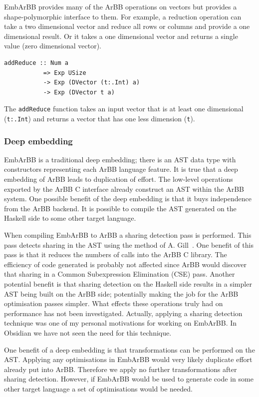 \documentclass[a4paper]{book}
\begin{document}
EmbArBB provides many of the ArBB operations on vectors but provides a 
shape-polymorphic interface to them. For example, a reduction operation can take a two  
dimensional vector and reduce all rows or columns and provide a one dimensional result. Or 
it takes a one dimensional vector and returns a single value (zero dimensional vector). 

\begin{verbatim} 
addReduce :: Num a 
           => Exp USize 
           -> Exp (DVector (t:.Int) a) 
           -> Exp (DVector t a) 
\end{verbatim} 

The {\tt addReduce} function takes an input vector that is at least one dimensional 
({\tt t:.Int}) and returns a vector that has one less dimension ({\tt t}).
 
\subsubsection{Deep embedding}

EmbArBB is a traditional deep embedding; there is an AST data type with constructors 
representing each ArBB language feature. It is true that a deep embedding of ArBB 
leads to duplication of effort. The low-level operations exported by the 
ArBB C interface already construct an AST within the ArBB system. One possible benefit 
of the deep embedding is that it buys independence from the ArBB backend. It is possible 
to compile the AST generated on the Haskell side to some other target language. 

When compiling EmbArBB to ArBB a sharing detection pass is performed. This pass detects 
sharing in the AST using the method of A. Gill~\citet{Gill}. One benefit of this pass 
is that it reduces the numbers of calls into the ArBB C library. The efficiency of code 
generated is probably not affected since ArBB would discover that sharing in a Common 
Subexpression Elimination (CSE) pass. Another potential benefit is that sharing detection 
on the Haskell side results in a simpler AST being built on the ArBB side; potentially making 
the job for the ArBB optimisation passes simpler. What effects these 
operations truly had on performance has not been investigated. Actually, applying a sharing 
detection technique was one of my personal motivations for working on EmbArBB. In Obsidian 
we have not seen the need for this technique.

One benefit of a deep embedding is that transformations can be performed on the AST. Applying 
any optimisations in EmbArBB would very likely duplicate effort already put into ArBB. 
Therefore we apply no further transformations after sharing detection. However, if EmbArBB 
would be used to generate code in some other target language a set of optimisations 
would be needed.  
\end{document}
